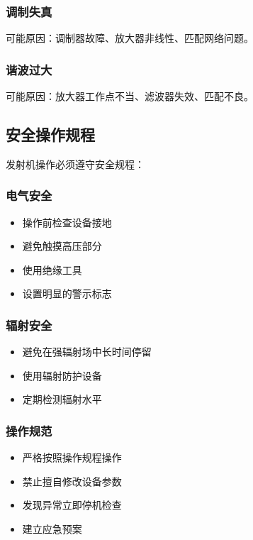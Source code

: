 \documentclass[12pt,UTF8]{ctexbook}
\begin{document}
\subsubsection{调制失真}
可能原因：调制器故障、放大器非线性、匹配网络问题。

\subsubsection{谐波过大}
可能原因：放大器工作点不当、滤波器失效、匹配不良。

\subsection{安全操作规程}

发射机操作必须遵守安全规程：

\subsubsection{电气安全}
\begin{itemize}[leftmargin=3.5em]
    \item 操作前检查设备接地
    \item 避免触摸高压部分
    \item 使用绝缘工具
    \item 设置明显的警示标志
\end{itemize}

\subsubsection{辐射安全}
\begin{itemize}[leftmargin=3.5em]
    \item 避免在强辐射场中长时间停留
    \item 使用辐射防护设备
    \item 定期检测辐射水平
\end{itemize}

\subsubsection{操作规范}
\begin{itemize}[leftmargin=3.5em]
    \item 严格按照操作规程操作
    \item 禁止擅自修改设备参数
    \item 发现异常立即停机检查
    \item 建立应急预案
\end{itemize}
\end{document}
